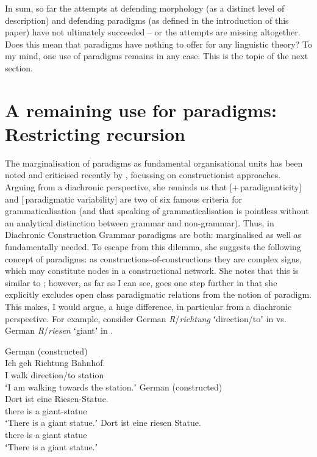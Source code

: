 \documentclass[output=paper]{langsci/langscibook}
\begin{document}
In sum, so far the attempts at defending morphology (as a distinct level of description) and defending paradigms (as defined in the introduction of this paper) have not ultimately succeeded – or the attempts are missing altogether. Does this mean that paradigms have nothing to offer for any linguistic theory? To my mind, one use of paradigms remains in any case. This is the topic of the next section.

\section{A remaining use for paradigms: Restricting recursion} \label{reiner:4}

The marginalisation of paradigms as fundamental organisational units has been noted and criticised recently by \citet{Diewald2020a}, focussing on constructionist approaches. Arguing from a diachronic perspective, she reminds us that [+\,par\-a\-dig\-mat\-i\-city] and [\textminus\,paradigmatic variability] are two of  six famous criteria for grammaticalisation (and that speaking of grammaticalisation is pointless without an analytical distinction between grammar and non-grammar). Thus, in Diachronic Construction Grammar paradigms are both: marginalised as well as fundamentally needed. To escape from this dilemma, she suggests the following concept of paradigms: as constructions-of-constructions they are complex signs, which may constitute nodes in a constructional network. She notes that this is similar to \citet{Booij2016}; however, as far as I can see, \citet[297--301]{Diewald2020a} goes one step further in that she explicitly excludes open class paradigmatic relations from the notion of paradigm. This makes, I would argue, a huge difference, in particular from a diachronic perspective. For example, consider German \textit{R}/\textit{richtung} ʻdirection/toʼ in  vs. German \textit{R}/\textit{riesen} ʻgiantʼ in .

\ea \label{ex:reiner:23} 
{German (constructed)}\\
\gll Ich  geh     Richtung        Bahnhof.\\
     I    walk    direction/to    station\\
\glt ʻI am walking towards the station.ʼ
\ex \label{ex:reiner:24} 
{German (constructed)}\\
\ea Dort  ist  eine  Riesen-Statue.\\
     there  is  a  giant-statue\\
\glt ʻThere is a giant statue.ʼ
\ex  Dort  ist  eine riesen  Statue.\\
     there  is  a giant  statue\\
\glt ʻThere is a giant statue.ʼ
\z \z
\end{document}
